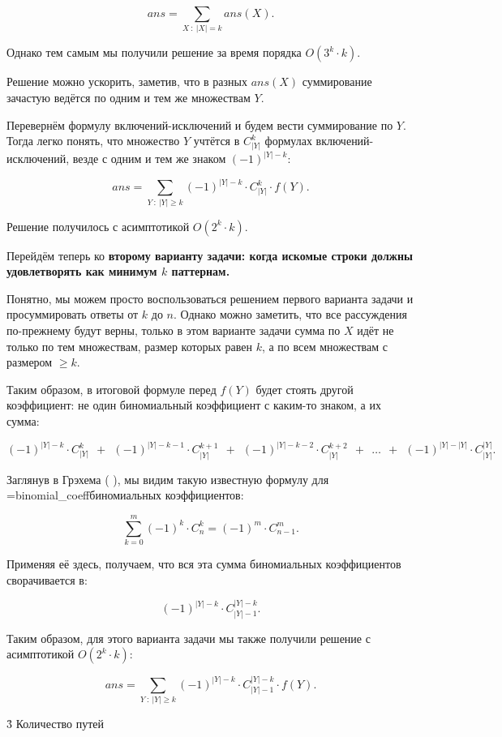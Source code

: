 $$ ans = \sum_{X ~ : ~ |X| = k} ans(X). $$

Однако тем самым мы получили решение за время порядка $O(3^k \cdot k)$.

Решение можно ускорить, заметив, что в разных $ans(X)$ суммирование зачастую ведётся по одним и тем же множествам $Y$.

Перевернём формулу включений-исключений и будем вести суммирование по $Y$. Тогда легко понять, что множество $Y$ учтётся в $C_{|Y|}^k$ формулах включений-исключений, везде с одним и тем же знаком $(-1)^{|Y|-k}$:

$$ ans = \sum_{Y ~ : ~ |Y| \ge k} (-1)^{|Y|-k} \cdot C_{|Y|}^k \cdot f(Y). $$

Решение получилось с асимптотикой $O(2^k \cdot k)$.

Перейдём теперь ко \bf{второму варианту задачи}: когда искомые строки должны удовлетворять как минимум $k$ паттернам.

Понятно, мы можем просто воспользоваться решением первого варианта задачи и просуммировать ответы от $k$ до $n$. Однако можно заметить, что все рассуждения по-прежнему будут верны, только в этом варианте задачи сумма по $X$ идёт не только по тем множествам, размер которых равен $k$, а по всем множествам с размером $\ge k$.

Таким образом, в итоговой формуле перед $f(Y)$ будет стоять другой коэффициент: не один биномиальный коэффициент с каким-то знаком, а их сумма:

$$ (-1)^{|Y|-k} \cdot C_{|Y|}^k ~~ + ~~ (-1)^{|Y|-k-1} \cdot C_{|Y|}^{k+1} ~~ + ~~ (-1)^{|Y|-k-2} \cdot C_{|Y|}^{k+2} ~~ + ~~ \ldots ~~ + ~~ (-1)^{|Y|-|Y|} \cdot C_{|Y|}^{|Y|}. $$

Заглянув в Грэхема (  ), мы видим такую известную формулу для \algohref=binomial_coeff{биномиальных коэффициентов}:

$$ \sum_{k=0}^m (-1)^k \cdot C_n^k = (-1)^m \cdot C_{n-1}^m. $$

Применяя её здесь, получаем, что вся эта сумма биномиальных коэффициентов сворачивается в:

$$ (-1)^{|Y|-k} \cdot C_{|Y|-1}^{|Y|-k}. $$

Таким образом, для этого варианта задачи мы также получили решение с асимптотикой $O(2^k \cdot k)$:

$$ ans = \sum_{Y ~ : ~ |Y| \ge k} (-1)^{|Y|-k} \cdot C_{|Y|-1}^{|Y|-k} \cdot f(Y). $$


\h3{ Количество путей }

